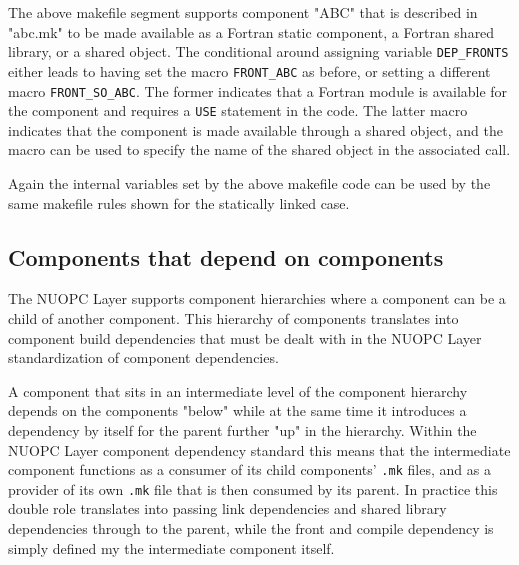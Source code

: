 The above makefile segment supports component "ABC" that is described in "abc.mk" to be made available as a Fortran static component, a Fortran shared library, or a shared object. The conditional around assigning variable {\tt DEP\_FRONTS} either leads to having set the macro {\tt FRONT\_ABC} as before, or setting a different macro {\tt FRONT\_SO\_ABC}. The former indicates that a Fortran module is available for the component and requires a {\tt USE} statement in the code. The latter macro indicates that the component is made available through a shared object, and the macro can be used to specify the name of the shared object in the associated call.

Again the internal variables set by the above makefile code can be used by the same makefile rules shown for the statically linked case.

\subsection{Components that depend on components}
\label{StandardCompDep:CompOnComp}

The NUOPC Layer supports component hierarchies where a component can be a child of another component. This hierarchy of components translates into component build dependencies that must be dealt with in the NUOPC Layer standardization of component dependencies.

A component that sits in an intermediate level of the component hierarchy depends on the components "below" while at the same time it introduces a dependency by itself for the parent further "up" in the hierarchy. Within the NUOPC Layer component dependency standard this means that the intermediate component functions as a consumer of its child components' {\tt .mk} files, and as a provider of its own {\tt .mk} file that is then consumed by its parent. In practice this double role translates into passing link dependencies and shared library dependencies through to the parent, while the front and compile dependency is simply defined my the intermediate component itself.

